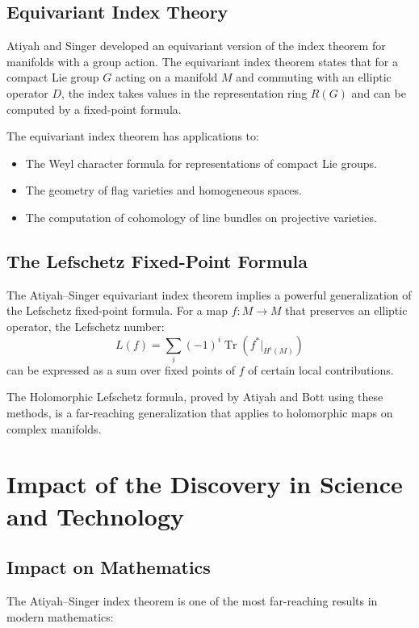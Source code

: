 \subsection{Equivariant Index Theory}

Atiyah and Singer developed an equivariant version of the index theorem for manifolds with a group action. The equivariant index theorem states that for a compact Lie group $G$ acting on a manifold $M$ and commuting with an elliptic operator $D$, the index takes values in the representation ring $R(G)$ and can be computed by a fixed-point formula.

The equivariant index theorem has applications to:
\begin{itemize}
\item The Weyl character formula for representations of compact Lie groups.
\item The geometry of flag varieties and homogeneous spaces.
\item The computation of cohomology of line bundles on projective varieties.
\end{itemize}

\subsection{The Lefschetz Fixed-Point Formula}

The Atiyah--Singer equivariant index theorem implies a powerful generalization of the Lefschetz fixed-point formula. For a map $f: M \to M$ that preserves an elliptic operator, the Lefschetz number:
\[
L(f) = \sum_i (-1)^i \operatorname{Tr}(f^*|_{H^i(M)})
\]
can be expressed as a sum over fixed points of $f$ of certain local contributions.

The Holomorphic Lefschetz formula, proved by Atiyah and Bott using these methods, is a far-reaching generalization that applies to holomorphic maps on complex manifolds.

\section{Impact of the Discovery in Science and Technology}

\subsection{Impact on Mathematics}

The Atiyah--Singer index theorem is one of the most far-reaching results in modern mathematics:

